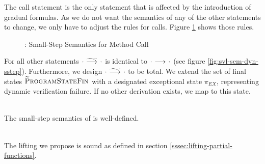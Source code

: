 The call statement is the only statement that is affected by the introduction of gradual formulas.
As we do not want the semantics of any of the other statements to change, we only have to adjust the rules for calls.
Figure \ref{fig:gvl-sem-dyn-sstep} shows those rules.

\begin{figure}[h]
    \boxed{\gsstep{\pi}{\pi}}
    
    \caption{\gvlidf: Small-Step Semantics for Method Call}
    \label{fig:gvl-sem-dyn-sstep}
\end{figure}

For all other statements ${\cdot} \,\,{\widetilde{\longrightarrow}^{}}\,\, {\cdot}$ is identical to ${\cdot} \,\,{\longrightarrow^{}}\,\, {\cdot}$ (see figure \ref{fig:svl-sem-dyn-sstep}).
Furthermore, we design ${\cdot} \,\,{\widetilde{\longrightarrow}^{}}\,\, {\cdot}$ to be total.
We extend the set of final states $\textup{\textsc{\ensuremath{\widetilde{\text{P}}}rogramStateFin}}$ with a designated exceptional state $\pi_{EX}$, representing dynamic verification failure.
If no other derivation exists, we map to this state.

\begin{lemma}\label{lemma:gss-wd}~\\
    The small-step semantics of \gvlidf is well-defined.
\end{lemma}

\begin{lemma}\label{lemma:gss-sl}~\\
    The lifting we propose is sound as defined in section \ref{sssec:lifting-partial-functions}.
\end{lemma}
